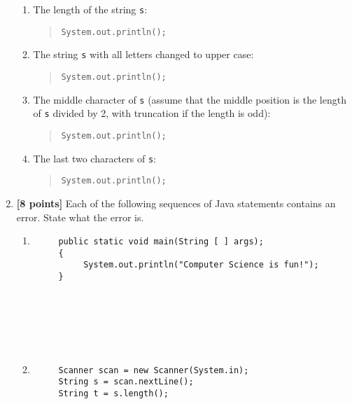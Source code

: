 \documentclass[11pt]{report}
\begin{document}
\begin{enumerate}
\begin{enumerate}
\item
The length of the string {\tt s}:

\bigskip
\bigskip
\bigskip
\begin{quote}
\verb$System.out.println($\underline{\hspace{3in}}\verb$);$
\end{quote}
\item
The string {\tt s} with all letters changed to upper case:

\bigskip
\bigskip
\bigskip
\begin{quote}
\verb$System.out.println($\underline{\hspace{3in}}\verb$);$
\end{quote}


\item
The middle character of {\tt s} (assume that the middle position is
the length of {\tt s} divided by 2, with truncation if the length is
odd):

\bigskip
\bigskip
\bigskip
\begin{quote}
\verb$System.out.println($\underline{\hspace{3in}}\verb$);$
\end{quote}

\item
The last two characters of {\tt s}:

\bigskip
\bigskip
\bigskip
\begin{quote}
\verb$System.out.println($\underline{\hspace{3in}}\verb$);$
\end{quote}
\end{enumerate}

\bigskip
\item {\bf [8 points]}
Each of the following sequences of Java statements contains an
error. State what the error is.
\begin{enumerate}
\item \mbox{}

\begin{verbatim}
     public static void main(String [ ] args);
     {
          System.out.println("Computer Science is fun!");
     }
     
     
     
     
     
     
\end{verbatim}
\item \mbox{}

\begin{verbatim}
     Scanner scan = new Scanner(System.in);
     String s = scan.nextLine();
     String t = s.length();
     

\end{verbatim}
\end{enumerate}
\end{enumerate}
\end{document}
